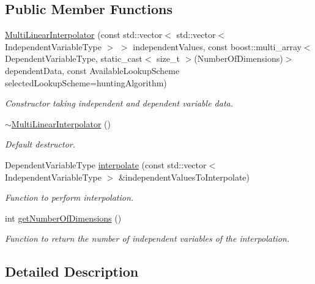 \subsection*{Public Member Functions}
\begin{DoxyCompactItemize}
\item 
\hyperlink{classtudat_1_1interpolators_1_1MultiLinearInterpolator_ad25643fd4d7de65225ff4e2f1fc9634b}{Multi\+Linear\+Interpolator} (const std\+::vector$<$ std\+::vector$<$ Independent\+Variable\+Type $>$ $>$ independent\+Values, const boost\+::multi\+\_\+array$<$ Dependent\+Variable\+Type, static\+\_\+cast$<$ size\+\_\+t $>$(Number\+Of\+Dimensions)$>$ dependent\+Data, const Available\+Lookup\+Scheme selected\+Lookup\+Scheme=hunting\+Algorithm)
\begin{DoxyCompactList}\small\item\em Constructor taking independent and dependent variable data. \end{DoxyCompactList}\item 
\hyperlink{classtudat_1_1interpolators_1_1MultiLinearInterpolator_a67681ba587347490e34a17750ba99d34}{$\sim$\+Multi\+Linear\+Interpolator} ()
\begin{DoxyCompactList}\small\item\em Default destructor. \end{DoxyCompactList}\item 
Dependent\+Variable\+Type \hyperlink{classtudat_1_1interpolators_1_1MultiLinearInterpolator_ac41f7ee6508212d5827fb461c850a75f}{interpolate} (const std\+::vector$<$ Independent\+Variable\+Type $>$ \&independent\+Values\+To\+Interpolate)
\begin{DoxyCompactList}\small\item\em Function to perform interpolation. \end{DoxyCompactList}\item 
int \hyperlink{classtudat_1_1interpolators_1_1MultiLinearInterpolator_abf364cf2456ae2df1f2c12ac5bdcf77b}{get\+Number\+Of\+Dimensions} ()
\begin{DoxyCompactList}\small\item\em Function to return the number of independent variables of the interpolation. \end{DoxyCompactList}\end{DoxyCompactItemize}


\subsection{Detailed Description}
